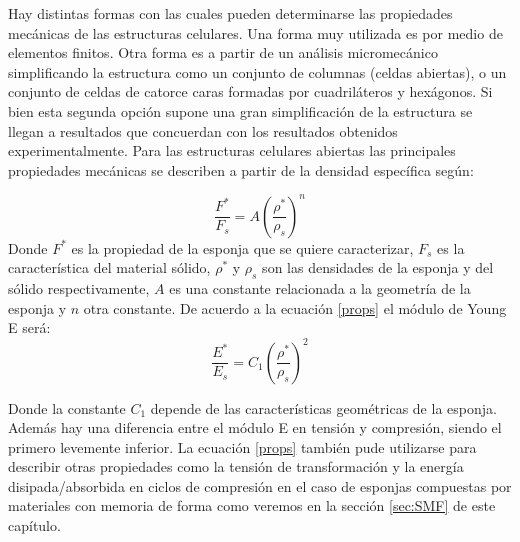 \documentclass[a4paper,12pt,fleqn,twoside,openany]{book}
\begin{document}
Hay distintas formas con las cuales pueden determinarse las propiedades mecánicas de las estructuras celulares. Una forma muy utilizada es por medio 
de elementos finitos. Otra forma
es a partir de un análisis micromecánico simplificando la estructura como un conjunto de columnas (celdas abiertas), o un conjunto de celdas de catorce caras formadas por cuadriláteros y hexágonos. Si bien esta segunda opción supone una gran simplificación de la estructura se llegan a resultados que concuerdan con los 
resultados obtenidos experimentalmente. Para las estructuras celulares abiertas las principales propiedades mecánicas se describen a partir de la densidad específica \cite{duering} según:

\begin{equation}
\frac{F^*}{F_s}=A \left(\frac{\rho^*}{\rho_s}\right)^n \label{props} 
\end{equation}
Donde $F^*$ es la propiedad de la esponja que se quiere caracterizar, $F_s$ es la característica del material sólido, $\rho^*$ y $\rho_s$ son las 
densidades de la esponja y del sólido respectivamente, $A$ es una constante relacionada a la geometría de la esponja y $n$ otra constante. De acuerdo 
a la ecuación \ref{props} el módulo de Young E \cite{duering} será:
\begin{equation}
\frac{E^*}{E_s}=C_1 \left(\frac{\rho^*}{\rho_s}\right)^2 \label{propsE}  
\end{equation}

Donde la constante $C_1$ depende de las características geométricas de la esponja. 
Además hay una diferencia entre el módulo E en tensión y compresión, siendo el primero levemente inferior. La ecuación \ref{props} también pude utilizarse 
para describir otras propiedades como la tensión de transformación y la energía disipada/absorbida en ciclos de compresión en el caso de esponjas 
compuestas por materiales con memoria de forma como veremos en la sección \ref{sec:SMF} de este capítulo. 

\end{document}
